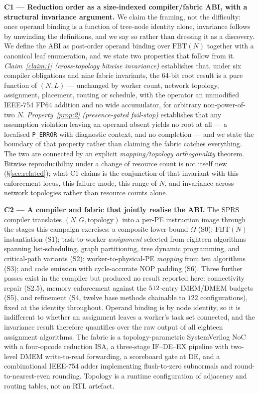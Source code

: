\documentclass[journal,10pt]{IEEEtran}
\theoremstyle{plain}
\theoremstyle{definition}
\theoremstyle{remark}
\newcommand{\FBT}{\ensuremath{\mathrm{FBT}}}
\newcommand{\sprs}{\textsc{SPRS}}
\begin{document}
\textbf{C1 --- Reduction order as a size-indexed compiler/fabric ABI, with a
structural invariance argument.} We claim the framing, not the difficulty:
once operand binding is a function of tree-node identity alone, invariance
follows by unwinding the definitions, and we say so rather than dressing it
as a discovery. We define the ABI as post-order operand binding over
$\FBT(N)$ together with a canonical leaf enumeration, and we state two
properties that follow from it. \emph{Claim~\ref{claim:1} (cross-topology
bitwise invariance)} establishes that, under six compiler obligations and
nine fabric invariants, the 64-bit root result is a pure function of
$(N, L)$ --- unchanged by worker count, network topology, assignment,
placement, routing or schedule, with the operator an unmodified IEEE-754
FP64 addition and no wide accumulator, for arbitrary non-power-of-two $N$.
\emph{Property~\ref{prop:2} (presence-gated fail-stop)} establishes that
any assumption violation leaving an operand absent yields no root at all ---
a localised \texttt{P\_ERROR} with diagnostic context, and no completion ---
and we state the boundary of that property rather than claiming the fabric
catches everything. The two are connected by an explicit
\emph{mapping/topology orthogonality} theorem. Bitwise reproducibility under
a change of resource count is not itself new (\S\ref{sec:related}); what C1
claims is the conjunction of that invariant with this enforcement locus,
this failure mode, this range of $N$, and invariance across network
topologies rather than resource counts alone.

\textbf{C2 --- A compiler and fabric that jointly realise the ABI.} The
\sprs{} compiler translates $(N, G, \text{topology})$ into a per-PE
instruction image through the \StagesRun{} stages this campaign exercises: a
composite lower-bound $\Omega$ (S0); $\FBT(N)$ instantiation (S1);
task-to-worker \emph{assignment} selected from eighteen algorithms spanning
list-scheduling, graph partitioning, tree dynamic programming, and
critical-path variants (S2); worker-to-physical-PE \emph{mapping} from ten
algorithms (S3); and code emission with cycle-accurate NOP padding (S6).
Three further passes exist in the compiler but produced no result reported
here: connectivity repair (S2.5), memory enforcement against the
$512$-entry IMEM/DMEM budgets (S5), and refinement (S4, twelve base methods
chainable to $122$ configurations), fixed at the identity throughout.
Operand binding is by node identity, so it is indifferent to whether an
assignment leaves a worker's task set connected, and the invariance result
therefore quantifies over the raw output of all eighteen assignment
algorithms. The fabric is a
topology-parametric SystemVerilog NoC with a four-opcode reduction ISA,
a three-stage IF--DE--EX pipeline with two-level DMEM write-to-read
forwarding, a scoreboard gate at DE, and a combinational IEEE-754 adder
implementing flush-to-zero subnormals and round-to-nearest-even rounding.
Topology is a runtime configuration of adjacency and routing tables, not
an RTL artefact.
\end{document}
